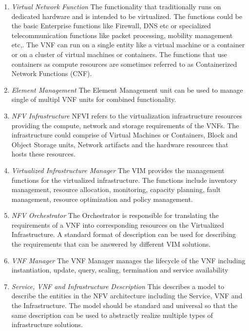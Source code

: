 \begin{enumerate}
    \item \textit{Virtual Network Function}
        The functionality that traditionally runs on dedicated hardware and is intended to be virtualized. The functions could be the basic Enterprise functions like Firewall, DNS etc or specialized telecommunication functions like packet processing, mobility management etc,. The VNF can run on a single entity like a virtual machine or a container or on a cluster of virtual machines or containers. The functions that use containers as compute resources are sometimes referred to as Containerized Network Functions (CNF). 

    \item \textit{Element Management}
        The Element Management unit can be used to manage single of multipl VNF units for combined functionality. 

    \item \textit{NFV Infrastructure}
        NFVI refers to the virtualization infrastructure resources providing the compute, network and storage requirements of the VNFs. The infrastructure could comprise of Virtual Machines or Containers, Block and Object Storage units, Network artifacts and the hardware resources that hosts these resources.   

    \item \textit{Virtualized Infrastructure Manager}
        The VIM provides the management functions for the virtualized infrastructure. The functions include inventory management, resource allocation, monitoring, capacity planning, fault management, resource optimization and policy management.

    \item \textit{NFV Orchestrator}
        The Orchestrator is responsible for translating the requirements of a VNF into corresponding resources on the Virtualized Infrastructure. A standard format of description can be used for describing the requirements that can be answered by different VIM solutions.

    \item \textit{VNF Manager}
        The VNF Manager manages the lifecycle of the VNF including instantiation, update, query, scaling, termination and service availability

    \item \textit{Service, VNF and Infrastructure Description}
        This describes a model to describe the entities in the NFV architecture including the Service, VNF and the Infrastructure. The model should be standard and universal so that the same description can be used to abstractly realize multiple types of infrastructure solutions. 


\end{enumerate}
